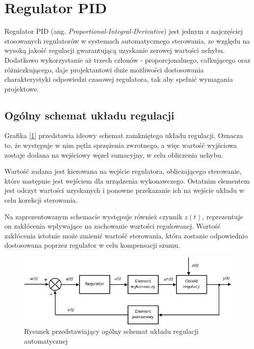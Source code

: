 \clearpage

\section{Regulator PID}

Regulator PID (ang. \textit{Proportional-Integral-Derivative}) jest jednym z najczęściej stosowanych regulatorów w systemach automatycznego sterowania, ze względu na wysoką jakość regulacji gwarantującą uzyskanie zerowej wartości uchybu. Dodatkowo wykorzystanie aż trzech członów - proporcjonalnego, całkującego oraz różniczkującego, daje projektantowi duże możliwości dostosowania charakterystyki odpowiedzi czasowej regulatora, tak aby spełnić wymagania projektowe. 

\subsection{Ogólny schemat układu regulacji}

Grafika [\ref{rys2:regulacja1}] przedstawia ideowy schemat zamkniętego układu regulacji. Oznacza to, że występuje w nim pętla sprzężenia zwrotnego, a więc wartość wyjściowa zostaje dodana na wejściowy węzeł sumacyjny, w celu obliczenia uchybu. 

Wartość zadana jest kierowana na wejście regulatora, obliczającego sterowanie, które następnie jest wejściem dla urządzenia wykonawczego. Ostatnim elementem jest odczyt wartości uzyskanych i ponowne przekazanie ich na wejście układu w celu korekcji sterowania.

Na zaprezentowanym schemacie występuje również czynnik \(z(t)\), reprezentuje on zakłócenia wpływające na zachowanie wartości regulowanej. Wartość zakłócenia istotnie może zmienić wartość sterowania, która zostanie odpowiednio dostosowana poprzez regulator w celu kompensacji szumu. 

\begin{figure}[H]
    \centering
    \includegraphics[width=1.0\textwidth]{./graf/regulacja1.png}
    \caption{Rysunek przedstawiający ogólny schemat układu regulacji automatycznej \cite{bib:wiki-regulacja}}
    \label{rys2:regulacja1}
\end{figure}

